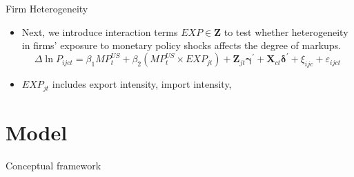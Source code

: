 \documentclass[10pt]{beamer}
\begin{document}
\begin{frame}{Firm Heterogeneity}
    \begin{itemize}
        \item Next, we introduce interaction terms $EXP \in \mathbf{Z}$ to test whether heterogeneity in firms' exposure to monetary policy shocks affects the degree of markups.
        \begin{equation}
    	\Delta \ln P_{i j c t}=\beta_1 M P_{t}^{US} + \beta_2 (M P_{t}^{US} \times EXP_{jt})+ \mathbf{Z}_{jt} \boldsymbol{\gamma}^{\prime}+\mathbf{X}_{ct} \boldsymbol{\delta}^{\prime} +\xi_{i j c} + \varepsilon_{ijct}
    	\label{eq.exposure}
        \end{equation}
        \item $EXP_{jt}$ includes export intensity, import intensity, 
    \end{itemize}
\end{frame}


\section{Model}

\begin{frame}{Conceptual framework}
    
\end{frame}
\end{document}
